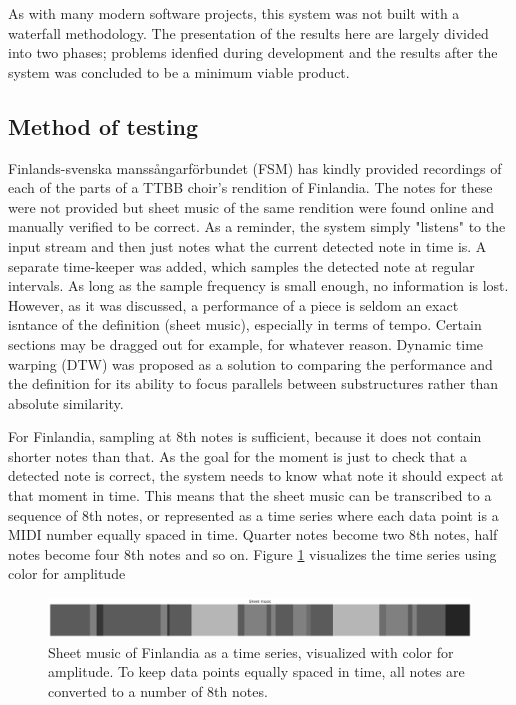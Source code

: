 As with many modern software projects, this system was not built with a waterfall methodology. The presentation of the results here are largely divided into two phases; problems idenfied during development and the results after the system was concluded to be a minimum viable product. 

\subsection{Method of testing}
Finlands-svenska manssångarförbundet (FSM) has kindly provided recordings of each of the parts of a TTBB choir's rendition of Finlandia. The notes for these were not provided but sheet music of the same rendition were found online and manually verified to be correct. As a reminder, the system simply "listens" to the input stream and then just notes what the current detected note in time is. A separate time-keeper was added, which samples the detected note at regular intervals. As long as the sample frequency is small enough, no information is lost. However, as it was discussed, a performance of a piece is seldom an exact isntance of the definition (sheet music), especially in terms of tempo. Certain sections may be dragged out for example, for whatever reason. Dynamic time warping (DTW) was proposed as a solution to comparing the performance and the definition for its ability to focus parallels between substructures rather than absolute similarity.

For Finlandia, sampling at 8th notes is sufficient, because it does not contain shorter notes than that. As the goal for the moment is just to check that a detected note is correct, the system needs to know what note it should expect at that moment in time. This means that the sheet music can be transcribed to a sequence of 8th notes, or represented as a time series where each data point is a MIDI number equally spaced in time. Quarter notes become two 8th notes, half notes become four 8th notes and so on. Figure \ref{fig:sheetEncoding} visualizes the time series using color for amplitude

\begin{figure}[ht]
    \centering
    \includegraphics[width=\textwidth]{./images/sheetEncoding.png}
    \caption{Sheet music of Finlandia as a time series, visualized with color for amplitude. To keep data points equally spaced in time, all notes are converted to a number of 8th notes. \label{fig:sheetEncoding}}
\end{figure}

